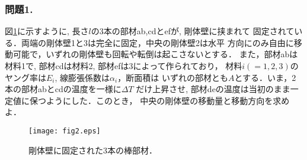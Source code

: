\documentclass[10pt,a4j]{jarticle}
\begin{document}
\subsubsection*{問題1.}
図\ref{fig:fig2}に示すように, 長さ$l$の3本の部材ab,cdとefが, 剛体壁に挟まれて
固定されている．両端の剛体壁1と3は完全に固定，中央の剛体壁2は水平
方向にのみ自由に移動可能で，いずれの剛体壁も回転や転倒は起こさないとする．
また，部材abは材料1で, 部材cdは材料2, 部材efは3によって作られており，
材料$i(=1,2,3)$のヤング率は$E_i$, 線膨張係数は$\alpha_i$，断面積は
いずれの部材とも$A$とする．いま，2本の部材abとcdの温度を一様に$\Delta T$
だけ上昇させ, 部材deの温度は当初のまま一定値に保つようにした．このとき，
中央の剛体壁の移動量と移動方向を求めよ．
\begin{figure}[h]
	\begin{center}
	\texttt{[image: fig2.eps]} 
	\end{center}
	\caption{剛体壁に固定された3本の棒部材．} 
	\label{fig:fig2}
\end{figure}
\end{document}
